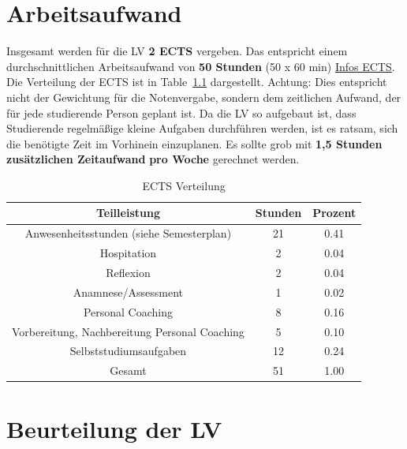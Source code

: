 \documentclass[
  letterpaper,
  DIV=11,
  numbers=noendperiod]{scrreprt}
\begin{document}

\chapter{Arbeitsaufwand}\label{arbeitsaufwand}

Insgesamt werden für die LV \textbf{2 ECTS} vergeben. Das entspricht
einem durchschnittlichen Arbeitsaufwand von \textbf{50 Stunden} (50 x 60
min)
\href{https://www.bmbwf.gv.at/Themen/HS-Uni/Studium/Anerkennung/ECTS-System.html}{Infos
ECTS}. Die Verteilung der ECTS ist in Table~\ref{tbl-ECTS} dargestellt.
Achtung: Dies entspricht nicht der Gewichtung für die Notenvergabe,
sondern dem zeitlichen Aufwand, der für jede studierende Person geplant
ist. Da die LV so aufgebaut ist, dass Studierende regelmäßige kleine
Aufgaben durchführen werden, ist es ratsam, sich die benötigte Zeit im
Vorhinein einzuplanen. Es sollte grob mit \textbf{1,5 Stunden
zusätzlichen Zeitaufwand} \textbf{pro Woche} gerechnet werden.

\begingroup\fontsize{12}{14}\selectfont

\begin{longtable}[t]{ccc}

\caption{\label{tbl-ECTS}ECTS Verteilung}

\tabularnewline

\toprule
Teilleistung & Stunden & Prozent\\
\midrule
Anwesenheitsstunden (siehe Semesterplan) & 21 & 0.41\\
Hospitation & 2 & 0.04\\
Reflexion & 2 & 0.04\\
Anamnese/Assessment & 1 & 0.02\\
Personal Coaching & 8 & 0.16\\
\addlinespace
Vorbereitung, Nachbereitung Personal Coaching & 5 & 0.10\\
Selbststudiumsaufgaben & 12 & 0.24\\
Gesamt & 51 & 1.00\\
\bottomrule

\end{longtable}

\endgroup{}


\chapter{Beurteilung der LV}\label{sec-beurteilung}
\end{document}
